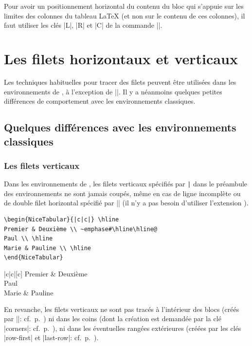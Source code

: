 \documentclass[dvipsnames]{article}%
\begin{document}
\medskip
Pour avoir un positionnement horizontal du contenu du bloc qui s'appuie sur les
limites des colonnes du tableau LaTeX (et non sur le contenu de ces colonnes),
il faut utiliser les clés |L|, |R| et |C| de la commande |\Block|.

\section{Les filets horizontaux et verticaux}
\label{rules}

Les techniques habituelles pour tracer des filets peuvent être utilisées dans
les environnements de , à l'exception de |\vline|. Il y a
néanmoins quelques petites différences de comportement avec les environnements
classiques.


\medskip
\subsection{Quelques différences avec les environnements classiques}

\subsubsection{Les filets verticaux}

Dans les environnements de , les filets verticaux spécifiés par
\verb+|+ dans le préambule des environnements ne sont jamais coupés, même en cas
de ligne incomplète ou de double filet horizontal spécifié par |\hline\hline|
(il n'y a pas besoin d'utiliser l'extension ).

\medskip
\begin{BVerbatim}[baseline=c,boxwidth=10cm]
\begin{NiceTabular}{|c|c|} \hline
Premier & Deuxième \\ ~emphase#\hline\hline@
Paul \\ \hline
Marie & Pauline \\ \hline
\end{NiceTabular}
\end{BVerbatim}
%
\begin{NiceTabular}{|c|c|}[c] \hline
Premier & Deuxième \\ \hline\hline
Paul \\ \hline
Marie & Pauline \\ \hline
\end{NiceTabular}


\medskip
En revanche, les filets verticaux ne sont pas tracés à l'intérieur des blocs
(créés par |\Block|: cf.~p.~\pageref{Block}) ni dans les coins (dont la création
est demandée par la clé |corners|: cf.~p.~\pageref{corners}), ni dans les
éventuelles rangées extérieures (créées par les clés |row-first| et |last-row|:
cf.~p.~\pageref{exterior}). 
\end{document}
